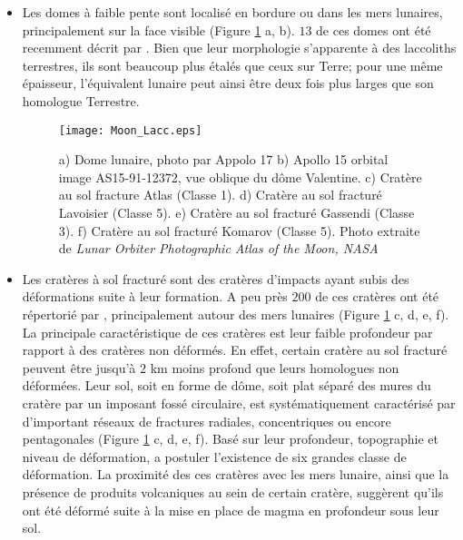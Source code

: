 \begin{itemize}
\item Les  domes à faible pente  sont localisé en bordure  ou dans les
  mers   lunaires,  principalement   sur  la   face  visible   (Figure
  \ref{Moon-magma} a, b).  $13$ de  ces domes ont été recemment décrit
  par \citep{Wohler:2007it}.  Bien que  leur morphologie s'apparente à
  des laccoliths  terrestres, ils sont  beaucoup plus étalés  que ceux
  sur Terre; pour une même  épaisseur, l'équivalent lunaire peut ainsi
  être deux fois plus larges que son homologue Terrestre.

  \begin{figure}
    \begin{center}
      \graphicspath{ {/Users/thorey/Documents/These/Manuscript/Figure/Chapter1/} }
      \texttt{[image: Moon\_Lacc.eps]}
      \caption{a)  Dome lunaire,  photo  par Appolo  17  b) Apollo  15
        orbital image  AS15-91-12372, vue  oblique du  dôme Valentine.
        c) Cratère au sol fracture Atlas (Classe 1). d) Cratère au sol
        fracturé  Lavoisier (Classe  5).  e)  Cratère au  sol fracturé
        Gassendi  (Classe  3).  f)  Cratère  au  sol fracturé  Komarov
        (Classe   5).   Photo   extraite   de  \textit{Lunar   Orbiter
          Photographic Atlas of the Moon, NASA}}
      \label{Moon-magma}
    \end{center}
  \end{figure}

\item Les  cratères à sol  fracturé sont des cratères  d'impacts ayant
  subis des déformations suite à leur formation.  A peu près $ 200$ de
  ces   cratères  ont   été  répertorié   par  \citet{Schultz:1976kt},
  principalement autour des mers  lunaires (Figure \ref{Moon-magma} c,
  d, e,  f).  La principale  caractéristique de ces cratères  est leur
  faible  profondeur par  rapport  à des  cratères  non déformés.   En
  effet, certain cratère  au sol fracturé peuvent être  jusqu'à $2$ km
  moins profond que leurs homologues non déformées.  Leur sol, soit en
  forme de dôme, soit plat séparé des mures du cratère par un imposant
  fossé circulaire,  est systématiquement caractérisé  par d'important
  réseaux de fractures radiales,  concentriques ou encore pentagonales
  (Figure \ref{Moon-magma}  c, d,  e, f).   Basé sur  leur profondeur,
  topographie  et  niveau  de  déformation,  \citet{Schultz:1976kt}  a
  postuler  l'existence  de six  grandes  classe  de déformation.   La
  proximité  des ces  cratères avec  les  mers lunaire,  ainsi que  la
  présence  de  produits  volcaniques  au  sein  de  certain  cratère,
  suggèrent qu'ils ont  été déformé suite à la mise  en place de magma
  en profondeur sous leur sol.
\end{itemize}


